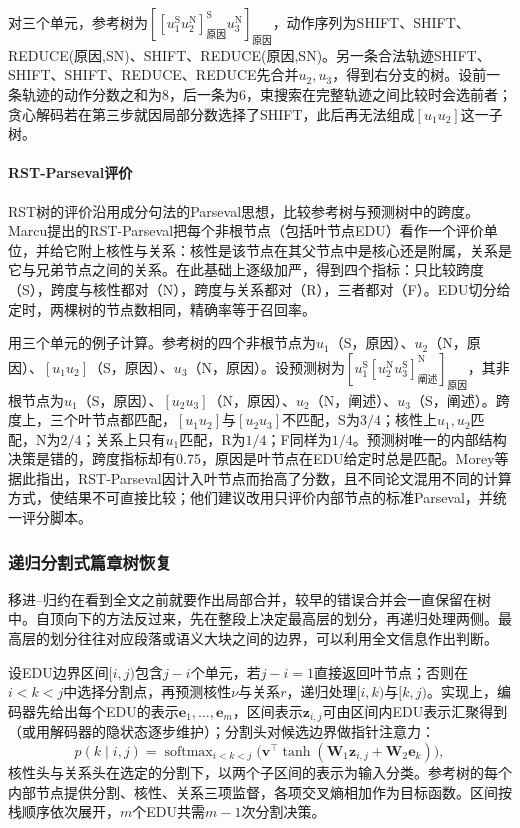 对三个单元，参考树为$[[u_1^{\mathrm S}u_2^{\mathrm N}]_{\text{原因}}^{\mathrm S}u_3^{\mathrm N}]_{\text{原因}}$，动作序列为SHIFT、SHIFT、REDUCE(原因,SN)、SHIFT、REDUCE(原因,SN)。另一条合法轨迹SHIFT、SHIFT、SHIFT、REDUCE、REDUCE先合并$u_2,u_3$，得到右分支的树。设前一条轨迹的动作分数之和为8，后一条为6，束搜索在完整轨迹之间比较时会选前者；贪心解码若在第三步就因局部分数选择了SHIFT，此后再无法组成$[u_1u_2]$这一子树。

\paragraph{RST-Parseval评价}
RST树的评价沿用成分句法的Parseval思想，比较参考树与预测树中的跨度。Marcu提出的RST-Parseval把每个非根节点（包括叶节点EDU）看作一个评价单位，并给它附上核性与关系：核性是该节点在其父节点中是核心还是附属，关系是它与兄弟节点之间的关系。在此基础上逐级加严，得到四个指标：只比较跨度（S），跨度与核性都对（N），跨度与关系都对（R），三者都对（F）。EDU切分给定时，两棵树的节点数相同，精确率等于召回率。

用三个单元的例子计算。参考树的四个非根节点为$u_1$（S，原因）、$u_2$（N，原因）、$[u_1u_2]$（S，原因）、$u_3$（N，原因）。设预测树为$[u_1^{\mathrm S}[u_2^{\mathrm N}u_3^{\mathrm S}]_{\text{阐述}}^{\mathrm N}]_{\text{原因}}$，其非根节点为$u_1$（S，原因）、$[u_2u_3]$（N，原因）、$u_2$（N，阐述）、$u_3$（S，阐述）。跨度上，三个叶节点都匹配，$[u_1u_2]$与$[u_2u_3]$不匹配，S为$3/4$；核性上$u_1,u_2$匹配，N为$2/4$；关系上只有$u_1$匹配，R为$1/4$；F同样为$1/4$。预测树唯一的内部结构决策是错的，跨度指标却有0.75，原因是叶节点在EDU给定时总是匹配。Morey等据此指出，RST-Parseval因计入叶节点而抬高了分数，且不同论文混用不同的计算方式，使结果不可直接比较；他们建议改用只评价内部节点的标准Parseval，并统一评分脚本。

\subsubsection{递归分割式篇章树恢复}
\label{sec:nlp-analysis-rst-split}

移进--归约在看到全文之前就要作出局部合并，较早的错误合并会一直保留在树中。自顶向下的方法反过来，先在整段上决定最高层的划分，再递归处理两侧。最高层的划分往往对应段落或语义大块之间的边界，可以利用全文信息作出判断。

设EDU边界区间$[i,j)$包含$j-i$个单元，若$j-i=1$直接返回叶节点；否则在$i<k<j$中选择分割点，再预测核性$\nu$与关系$r$，递归处理$[i,k)$与$[k,j)$。实现上，编码器先给出每个EDU的表示$\bm e_1,\ldots,\bm e_m$，区间表示$\bm z_{i,j}$可由区间内EDU表示汇聚得到（或用解码器的隐状态逐步维护）；分割头对候选边界做指针注意力：
\[
  p(k\mid i,j)=\operatorname{softmax}_{i<k<j}\bigl(\bm v^{\top}\tanh(\bm W_1\bm z_{i,j}+\bm W_2\bm e_k)\bigr),
\]
核性头与关系头在选定的分割下，以两个子区间的表示为输入分类。参考树的每个内部节点提供分割、核性、关系三项监督，各项交叉熵相加作为目标函数。区间按栈顺序依次展开，$m$个EDU共需$m-1$次分割决策。

